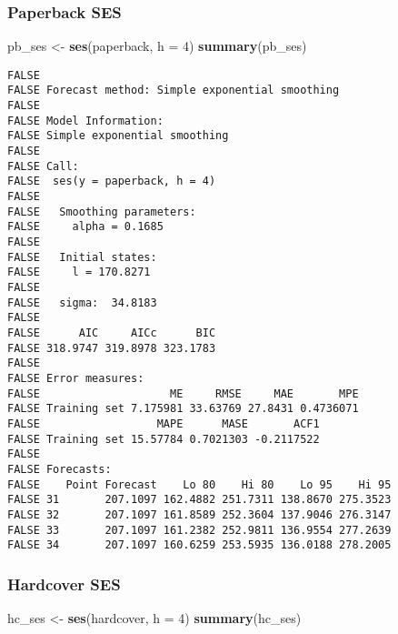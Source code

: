 \documentclass[openany]{book}
\newenvironment{Shaded}{\begin{snugshade}}{\end{snugshade}}
\newcommand{\DataTypeTok}[1]{\textcolor[rgb]{0.13,0.29,0.53}{#1}}
\newcommand{\DecValTok}[1]{\textcolor[rgb]{0.00,0.00,0.81}{#1}}
\newcommand{\KeywordTok}[1]{\textcolor[rgb]{0.13,0.29,0.53}{\textbf{#1}}}
\newcommand{\NormalTok}[1]{#1}
\newcommand{\StringTok}[1]{\textcolor[rgb]{0.31,0.60,0.02}{#1}}
\begin{document}
\hypertarget{paperback-ses}{%
\subsubsection{Paperback SES}\label{paperback-ses}}

\begin{Shaded}
\begin{Highlighting}[]
\NormalTok{pb_ses <-}\StringTok{ }\KeywordTok{ses}\NormalTok{(paperback, }\DataTypeTok{h =} \DecValTok{4}\NormalTok{)}
\KeywordTok{summary}\NormalTok{(pb_ses)}
\end{Highlighting}
\end{Shaded}

\begin{verbatim}
FALSE 
FALSE Forecast method: Simple exponential smoothing
FALSE 
FALSE Model Information:
FALSE Simple exponential smoothing 
FALSE 
FALSE Call:
FALSE  ses(y = paperback, h = 4) 
FALSE 
FALSE   Smoothing parameters:
FALSE     alpha = 0.1685 
FALSE 
FALSE   Initial states:
FALSE     l = 170.8271 
FALSE 
FALSE   sigma:  34.8183
FALSE 
FALSE      AIC     AICc      BIC 
FALSE 318.9747 319.8978 323.1783 
FALSE 
FALSE Error measures:
FALSE                    ME     RMSE     MAE       MPE
FALSE Training set 7.175981 33.63769 27.8431 0.4736071
FALSE                  MAPE      MASE       ACF1
FALSE Training set 15.57784 0.7021303 -0.2117522
FALSE 
FALSE Forecasts:
FALSE    Point Forecast    Lo 80    Hi 80    Lo 95    Hi 95
FALSE 31       207.1097 162.4882 251.7311 138.8670 275.3523
FALSE 32       207.1097 161.8589 252.3604 137.9046 276.3147
FALSE 33       207.1097 161.2382 252.9811 136.9554 277.2639
FALSE 34       207.1097 160.6259 253.5935 136.0188 278.2005
\end{verbatim}

\hypertarget{hardcover-ses}{%
\subsubsection{Hardcover SES}\label{hardcover-ses}}

\begin{Shaded}
\begin{Highlighting}[]
\NormalTok{hc_ses <-}\StringTok{ }\KeywordTok{ses}\NormalTok{(hardcover, }\DataTypeTok{h =} \DecValTok{4}\NormalTok{)}
\KeywordTok{summary}\NormalTok{(hc_ses)}
\end{Highlighting}
\end{Shaded}
\end{document}
